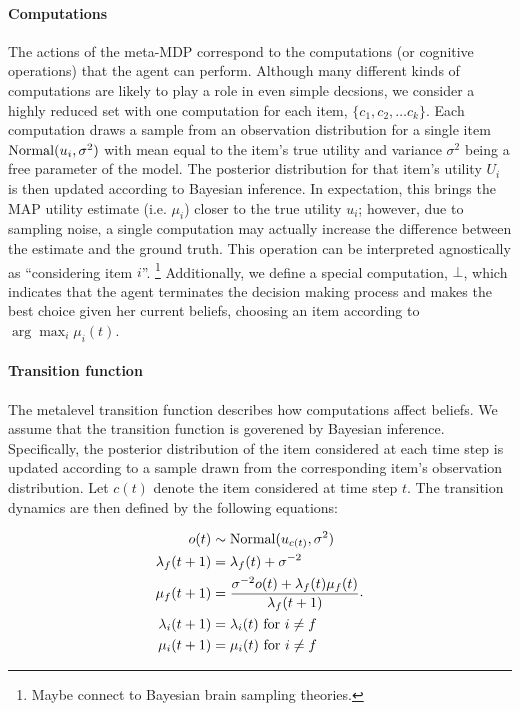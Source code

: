 \documentclass[12pt,a4paperpaper,]{article}
\begin{document}
\paragraph{Computations}
The actions of the meta-MDP correspond to the computations (or cognitive operations) that the agent can perform. Although many different kinds of computations are likely to play a role in even simple decsions, we consider a highly reduced set with one computation for each item, $\{c_1, c_2, \dots c_k \}$. Each computation draws a sample from an observation distribution for a single item $\mathrm{Normal}(u_i, \sigma^2)$ with mean equal to the item's true utility and variance $\sigma^2$ being a free parameter of the model. The posterior distribution for that item's utility $U_i$ is then updated according to Bayesian inference. In expectation, this brings the MAP utility estimate (i.e. $\mu_i$) closer to the true utility $u_i$; however, due to sampling noise, a single computation may actually increase the difference between the estimate and the ground truth. This operation can be interpreted agnostically as ``considering item $i$''.%
  \footnote{Maybe connect to Bayesian brain sampling theories.}
Additionally, we define a special computation, $\bot$, which indicates that the agent terminates the decision making process and makes the best choice given her current beliefs, choosing an item according to $\arg\max_i \mu_i(t)$.

\paragraph{Transition function}
The metalevel transition function describes how computations affect beliefs. We assume that the transition function is goverened by Bayesian inference. Specifically, the posterior distribution of the item considered at each time step is updated according to a sample drawn from the corresponding item's observation distribution. Let $c(t)$ denote the item considered at time step $t$. The transition dynamics are then defined by the following equations:

\begin{equation}
\begin{aligned}
  o(t) &\sim \mathrm{Normal}(u_{c(t)}, \sigma^2) \\
  \lambda_f(t+1) &= \lambda_f(t) + \sigma^{-2}  \\
  \mu_f(t+1) &= \frac{\sigma^{-2} o(t) + \lambda_f(t) \mu_f(t)}{\lambda_f(t+1)}  \\
  \lambda_i(t+1) &= \lambda_i(t) \text{ for } i \neq f  \\
  \mu_i(t+1) &= \mu_i(t) \text{ for } i \neq f  \\
\end{aligned}
.
\end{equation}
\end{document}
